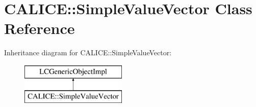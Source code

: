 \section{C\-A\-L\-I\-C\-E\-:\-:Simple\-Value\-Vector Class Reference}
\label{classCALICE_1_1SimpleValueVector}
Inheritance diagram for C\-A\-L\-I\-C\-E\-:\-:Simple\-Value\-Vector\-:\begin{figure}[H]
\begin{center}
\leavevmode
\includegraphics[height=2.000000cm]{classCALICE_1_1SimpleValueVector}
\end{center}
\end{figure}
